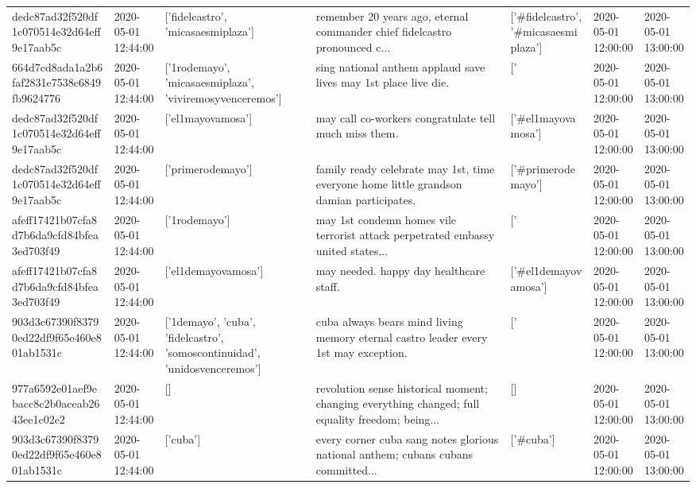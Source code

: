 \begin{tabular}{lllllll}
dedc87ad32f520df1c070514e32d64eff9e17aab5c & 2020-05-01 12:44:00 & ['fidelcastro', 'micasaesmiplaza'] & remember 2️0️ years ago, eternal commander chief fidelcastro pronounced c... & ['#fidelcastro', '#micasaesmiplaza'] & 2020-05-01 12:00:00 & 2020-05-01 13:00:00 \\
664d7cd8ada1a2b6faf2831e7538c6849fb9624776 & 2020-05-01 12:44:00 & ['1rodemayo', 'micasaesmiplaza', 'viviremosyvenceremos'] & sing national anthem applaud save lives may 1st place live die. & ['#1rodemayo', '#micasaesmiplaza', '#viviremosyvenceremos'] & 2020-05-01 12:00:00 & 2020-05-01 13:00:00 \\
dedc87ad32f520df1c070514e32d64eff9e17aab5c & 2020-05-01 12:44:00 & ['el1mayovamosa'] & may call co-workers congratulate tell much miss them. & ['#el1mayovamosa'] & 2020-05-01 12:00:00 & 2020-05-01 13:00:00 \\
dedc87ad32f520df1c070514e32d64eff9e17aab5c & 2020-05-01 12:44:00 & ['primerodemayo'] & family ready celebrate may 1st, time everyone home little grandson damian participates. & ['#primerodemayo'] & 2020-05-01 12:00:00 & 2020-05-01 13:00:00 \\
afeff17421b07cfa8d7b6da9cfd84bfea3ed703f49 & 2020-05-01 12:44:00 & ['1rodemayo'] & may 1st condemn homes vile terrorist attack perpetrated embassy united states... & ['#1rodemayo'] & 2020-05-01 12:00:00 & 2020-05-01 13:00:00 \\
afeff17421b07cfa8d7b6da9cfd84bfea3ed703f49 & 2020-05-01 12:44:00 & ['el1demayovamosa'] & may needed. happy day healthcare staff. & ['#el1demayovamosa'] & 2020-05-01 12:00:00 & 2020-05-01 13:00:00 \\
903d3c67390f83790ed22df9f65e460e801ab1531c & 2020-05-01 12:44:00 & ['1demayo', 'cuba', 'fidelcastro', 'somoscontinuidad', 'unidosvenceremos'] & cuba always bears mind living memory eternal castro leader every 1st may exception. & ['#1demayo', '#cuba', '#fidelcastro', '#somoscontinuidad', '#unidosvenceremos'] & 2020-05-01 12:00:00 & 2020-05-01 13:00:00 \\
977a6592e01aef9ebacc8c2b0aceab2643ee1c02e2 & 2020-05-01 12:44:00 & [] & revolution sense historical moment; changing everything changed; full equality freedom; being... & [] & 2020-05-01 12:00:00 & 2020-05-01 13:00:00 \\
903d3c67390f83790ed22df9f65e460e801ab1531c & 2020-05-01 12:44:00 & ['cuba'] & every corner cuba sang notes glorious national anthem; cubans cubans committed... & ['#cuba'] & 2020-05-01 12:00:00 & 2020-05-01 13:00:00 \\

\end{tabular}
